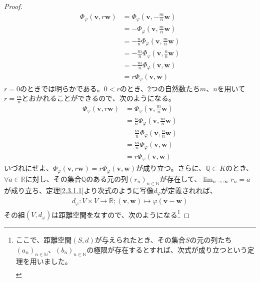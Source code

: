 \documentclass[dvipdfmx]{jsarticle}
\begin{document}
\begin{proof}
\begin{align*}
\varPhi_{\varphi}\left( \mathbf{v},r\mathbf{w} \right) &= \varPhi_{\varphi}\left( \mathbf{v}, - \frac{m}{n}\mathbf{w} \right)\\
&= - \varPhi_{\varphi}\left( \mathbf{v},\frac{m}{n}\mathbf{w} \right)\\
&= - \frac{n}{n}\varPhi_{\varphi}\left( \mathbf{v},\frac{m}{n}\mathbf{w} \right)\\
&= - \frac{m}{n}\varPhi_{\varphi}\left( \mathbf{v},\frac{n}{n}\mathbf{w} \right)\\
&= - \frac{m}{n}\varPhi_{\varphi}\left( \mathbf{v},\mathbf{w} \right)\\
&= r\varPhi_{\varphi}\left( \mathbf{v},\mathbf{w} \right)
\end{align*}
$r = 0$のときでは明らかである。$0 < r$のとき、2つの自然数たち$m$、$n$を用いて$r = \frac{m}{n}$とおかれることができるので、次のようになる。
\begin{align*}
\varPhi_{\varphi}\left( \mathbf{v},r\mathbf{w} \right) &= \varPhi_{\varphi}\left( \mathbf{v},\frac{m}{n}\mathbf{w} \right)\\
&= \frac{n}{n}\varPhi_{\varphi}\left( \mathbf{v},\frac{m}{n}\mathbf{w} \right)\\
&= \frac{m}{n}\varPhi_{\varphi}\left( \mathbf{v},\frac{n}{n}\mathbf{w} \right)\\
&= \frac{m}{n}\varPhi_{\varphi}\left( \mathbf{v},\mathbf{w} \right)\\
&= r\varPhi_{\varphi}\left( \mathbf{v},\mathbf{w} \right)
\end{align*}
いづれにせよ、$\varPhi_{\varphi}\left( \mathbf{v},r\mathbf{w} \right) = r\varPhi_{\varphi}\left( \mathbf{v},\mathbf{w} \right)$が成り立つ。さらに、$\mathbb{Q} \subset K$のとき、$\forall a \in \mathbb{R}$に対し、その集合$\mathbb{Q}$のある元の列$\left( r_{n} \right)_{n \in \mathbb{N}}$が存在して、$\lim_{n \rightarrow \infty}r_{n} = a$が成り立ち、定理\ref{2.3.1.1}より次式のように写像$d_{\varphi}$が定義されれば、
\begin{align*}
d_{\varphi}:V \times V \rightarrow \mathbb{R};\left( \mathbf{v},\mathbf{w} \right) \mapsto \varphi\left( \mathbf{v} - \mathbf{w} \right)
\end{align*}
その組$\left( V,d_{\varphi} \right)$は距離空間をなすので、次のようになる\footnote{ここで、距離空間$(S,d)$が与えられたとき、その集合$S$の元の列たち$\left( a_{n} \right)_{n \in \mathbb{N}}$、$\left( b_{n} \right)_{n \in \mathbb{N}}$の極限が存在するとすれば、次式が成り立つという定理を用いました。
\begin{align*}

\end{align*}}
\end{proof}
\end{document}
